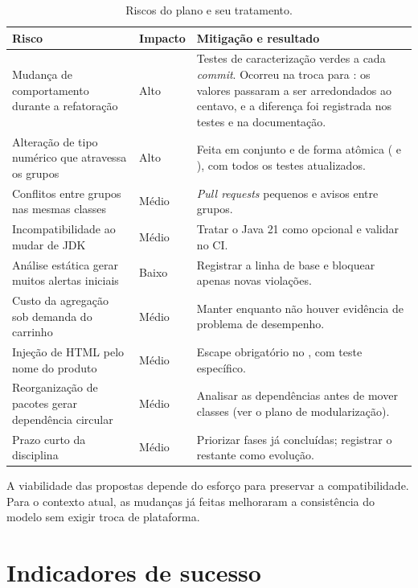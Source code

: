 \begin{table}[H]\centering\small\singlespacing
\begin{tabularx}{\textwidth}{>{\raggedright\arraybackslash}p{4.3cm}>{\raggedright\arraybackslash}p{1.8cm}Y}
\toprule \textbf{Risco} & \textbf{Impacto} & \textbf{Mitigação e resultado} \\ \midrule
Mudança de comportamento durante a refatoração & Alto & Testes de caracterização verdes a cada \textit{commit}. Ocorreu na troca para : os valores passaram a ser arredondados ao centavo, e a diferença foi registrada nos testes e na documentação. \\
Alteração de tipo numérico que atravessa os grupos & Alto & Feita em conjunto e de forma atômica ( e ), com todos os testes atualizados. \\
Conflitos entre grupos nas mesmas classes & Médio & \textit{Pull requests} pequenos e avisos entre grupos. \\
Incompatibilidade ao mudar de JDK & Médio & Tratar o Java 21 como opcional e validar no CI. \\
Análise estática gerar muitos alertas iniciais & Baixo & Registrar a linha de base e bloquear apenas novas violações. \\
Custo da agregação sob demanda do carrinho & Médio & Manter enquanto não houver evidência de problema de desempenho. \\
Injeção de HTML pelo nome do produto & Médio & Escape obrigatório no , com teste específico. \\
Reorganização de pacotes gerar dependência circular & Médio & Analisar as dependências antes de mover classes (ver o plano de modularização). \\
Prazo curto da disciplina & Médio & Priorizar fases já concluídas; registrar o restante como evolução. \\
\bottomrule\end{tabularx}
\caption{Riscos do plano e seu tratamento.}\end{table}

A viabilidade das propostas depende do esforço para preservar a compatibilidade. Para o contexto atual, as mudanças já feitas melhoraram a consistência do modelo sem exigir troca de plataforma.

\section{Indicadores de sucesso}

